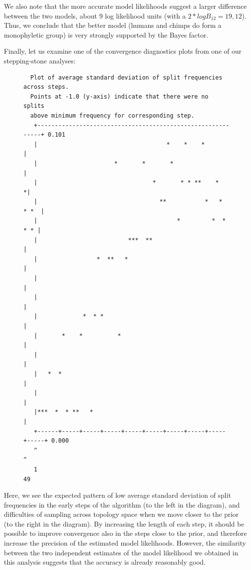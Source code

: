 \documentclass[12pt]{book}
\begin{document}
We also note that the more accurate model likelihoods suggest a larger difference between the two
models, about 9 log likelihood units (with a $2*logB_{12} = 19,12$). Thus, we conclude that the
better model (humans and chimps do form a monophyletic group) is very strongly supported by the
Bayes factor.\newpage

Finally, let us examine one of the convergence diagnostics plots from one of our stepping-stone
analyses:

\begin{figure}[h]\singlespacing\footnotesize
\begin{verbatim}
  Plot of average standard deviation of split frequencies across steps.
  Points at -1.0 (y-axis) indicate that there were no splits
  above minimum frequency for corresponding step.
   +------------------------------------------------------------+ 0.101
   |                                     *    *    *            |
   |                      *       *       *                     |
   |                                 *       * * **    *       *|
   |                                   **           *   *  * *  |
   |                                        *         *  *  * * |
   |                          ***  **                           |
   |                 *  **   *                                  |
   |                                                            |
   |                                                            |
   |             *  * *                                         |
   |       *    *          *                                    |
   |                                                            |
   |   *  *                                                     |
   |                                                            |
   |***  *  * **   *                                            |
   +------+-----+-----+-----+-----+-----+-----+-----+-----+-----+ 0.000
   ^                                                            ^
   1                                                           49
\end{verbatim}\end{figure}

Here, we see the expected pattern of low average standard deviation of split frequencies in the
early steps of the algorithm (to the left in the diagram), and difficulties of sampling across
topology space when we move closer to the prior (to the right in the diagram). By increasing the
length of each step, it should be possible to improve convergence also in the steps close to the
prior, and therefore increase the precision of the estimated model likelihoods. However, the
similarity between the two independent estimates of the model likelihood we obtained in this
analysis suggests that the accuracy is already reasonably good.
\end{document}
